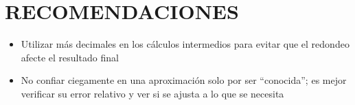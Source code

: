 \documentclass[12pt]{article}
\begin{document}
\vspace{0.5cm}

\section*{RECOMENDACIONES}
\begin{itemize}

     \item {Utilizar más decimales en los cálculos intermedios para evitar que el redondeo afecte el resultado final}
     \item {No confiar ciegamente en una aproximación solo por ser “conocida”; es mejor verificar su error relativo y ver si se ajusta a lo que se necesita}
     \
\end{itemize}


\vspace{0.5cm}


\renewcommand{\refname}{\MakeUppercase{REFERENCIAS}}


\end{document}
